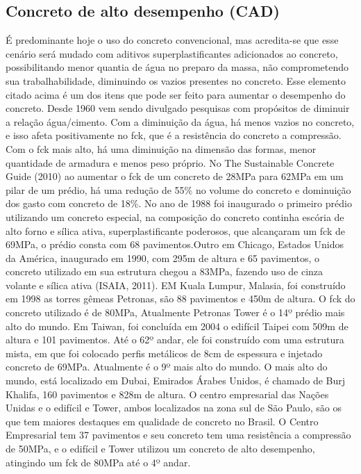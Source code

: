 \subsection{Concreto de alto desempenho (CAD)}

É predominante hoje o uso do concreto convencional, mas acredita-se que esse cenário será mudado com aditivos superplastificantes adicionados ao concreto, possibilitando menor quantia de água no preparo da massa, não comprometendo sua trabalhabilidade, diminuindo os vazios presentes no concreto. Esse elemento citado acima é um dos itens que pode ser feito para aumentar o desempenho do concreto.
Desde 1960 vem sendo divulgado pesquisas com propósitos de diminuir a relação água/cimento. Com a diminuição da água, há menos vazios no concreto, e isso afeta positivamente no fck, que é a resistência do concreto a compressão. Com o fck mais alto, há uma diminuição na dimensão das formas, menor quantidade de armadura e menos peso próprio. No The Sustainable Concrete Guide (2010) ao aumentar o fck de um concreto de 28MPa para 62MPa em um pilar de um prédio, há uma redução de 55\% no volume do concreto e dominuição dos gasto com concreto de 18\%.
No ano de 1988 foi inaugurado o primeiro prédio utilizando um concreto especial, na composição do concreto continha escória de alto forno e sílica ativa, superplastificante poderosos, que alcançaram um fck de 69MPa, o prédio consta com 68 pavimentos.Outro em Chicago, Estados Unidos da América, inaugurado em 1990, com 295m de altura e 65 pavimentos, o concreto utilizado em sua estrutura chegou a 83MPa, fazendo uso de cinza volante e sílica ativa (ISAIA, 2011). EM Kuala Lumpur, Malasia, foi construído em 1998 as torres gêmeas Petronas, são 88 pavimentos e 450m de altura. O fck do concreto utilizado é de 80MPa, Atualmente Petronas Tower é o 14º prédio mais alto do mundo. Em Taiwan, foi concluída em 2004 o edifícil Taipei com 509m de altura e 101 pavimentos. Até o 62º andar, ele foi construído com uma estrutura mista, em que foi colocado perfis metálicos de 8cm de espessura e injetado concreto de 69MPa. Atualmente é o 9º mais alto do mundo.
O mais alto do mundo, está localizado em Dubai, Emirados Árabes Unidos, é chamado de Burj Khalifa, 160 pavimentos e 828m de altura.
O centro empresarial das Nações Unidas e o edifícil e Tower, ambos localizados na zona sul de São Paulo, são os que tem maiores destaques em qualidade de concreto no Brasil. O Centro Empresarial tem 37 pavimentos e seu concreto tem uma resistência a compressão de 50MPa, e o edifícil e Tower utilizou um concreto de alto desempenho, atingindo um fck de 80MPa até o 4º andar.
